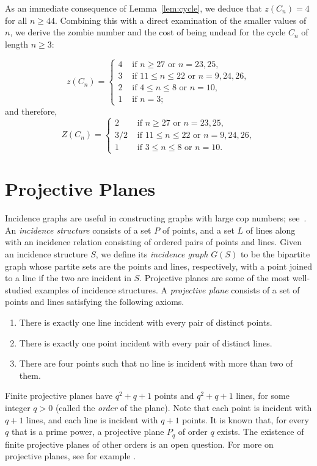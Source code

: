 \documentclass[12pt]{amsart}
\begin{document}
As an immediate consequence of Lemma~\ref{lem:cycle}, we deduce that $z(C_n) = 4$ for all $n \ge 44$. Combining this with a direct examination of the smaller values of $n$, we derive the zombie number and the cost of being undead for the cycle $C_n$ of length $n\ge3$:
\begin{theorem}\label{cycle}
$$
z(C_n) =
\begin{cases}
4 & \text{ if } n\ge 27 \text{ or } n=23, 25,\\
3 & \text{ if } 11 \le n \le 22 \text{ or } n=9, 24, 26, \\
2 & \text{ if } 4 \le n \le 8 \text{ or } n = 10,\\
1 & \text{ if } n = 3;
\end{cases}
$$
and therefore,
$$
Z(C_n) =
\begin{cases}
2 & \text{ if } n\ge 27 \text{ or } n=23, 25,\\
3/2 & \text{ if } 11 \le n \le 22 \text{ or } n=9, 24, 26, \\
1 & \text{ if } 3 \le n \le 8 \text{ or } n = 10.
\end{cases}
$$
\end{theorem}


\section{Projective Planes}\label{secproj}

Incidence graphs are useful in constructing graphs with large cop numbers; see~\cite{Designs,p}. An \emph{incidence structure} consists of a set $P$ of points, and a set $L$ of lines along with an
incidence relation consisting of ordered pairs of points and lines. Given an incidence structure $S$, we define its \emph{incidence graph} $G(S)$ to be the bipartite graph whose partite sets are the points and lines, respectively, with a point joined to a line if the two are incident in $S.$  Projective planes are some of the most well-studied examples of incidence
structures. A \emph{projective plane} consists of a set of points and lines satisfying the following axioms.

\begin{enumerate}
\item There is exactly one line incident with every pair of distinct points.

\item There is exactly one point incident with every pair of distinct lines.

\item There are four points such that no line is incident with more than two of them.
\end{enumerate}
Finite projective planes have $q^{2}+q+1$ points and $q^{2}+q+1$ lines, for some integer $q>0$ (called the \emph{order} of the plane). Note that each point is incident with $q+1$ lines, and each line is incident with $q+1$ points.
It is known that, for every $q$ that is a prime power, a projective plane $P_q$ of order $q$ exists. The existence of finite projective planes of other orders is an open question. For more on projective planes, see for example \cite{dem}.
\end{document}
